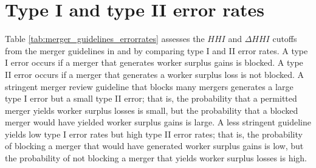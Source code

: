 \documentclass[12pt]{article}
\theoremstyle{prop}
\begin{document}

\section{Type I and type II error rates}
\label{app:error}

Table \ref{tab:merger_guidelines_errorrates} assesses the $HHI$ and $\Delta HHI$ cutoffs from the merger guidelines in \cite{doj1982guidelines} and \cite{doj2010guidelines} by comparing type I and II error rates. A type I error occurs if a merger that generates worker surplus gains is blocked. A type II error occurs if a merger that generates a worker surplus loss is not blocked. A stringent merger review guideline that blocks many mergers generates a large type I error but a small type II error; that is, the probability that a permitted merger yields worker surplus losses is small, but the probability that a blocked merger would have yielded worker surplus gains is large. A less stringent guideline yields low type I error rates but high type II error rates; that is, the probability of blocking a merger that would have generated worker surplus gains is low, but the probability of not blocking a merger that yields worker surplus losses is high. 
\end{document}

